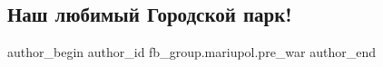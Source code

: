 
 
 
 
 

\subsection{Наш любимый Городской парк!}
\label{sec:12_02_2023.fb.fb_group.mariupol.pre_war.6.nash_lyubimii_gorods}

\ifcmt
 author_begin
   author_id fb_group.mariupol.pre_war
 author_end
\fi
